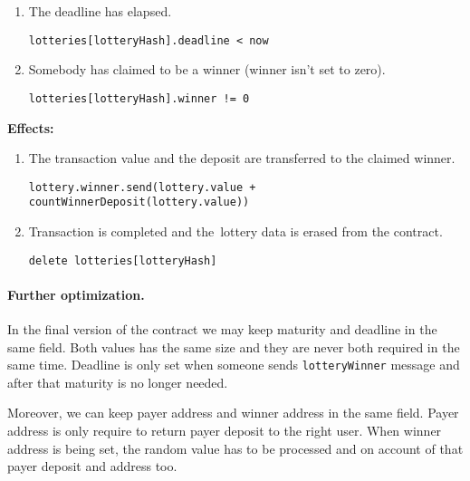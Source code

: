 \documentclass[a4paper]{article}
\begin{document}
\begin{enumerate}
            \begin{enumerate}
                \item The deadline has elapsed.
                    \begin{center}
		                \texttt{lotteries[lotteryHash].deadline < now}
		            \end{center}
                \item Somebody has claimed to be a winner (winner isn't set to zero).
                    \begin{center}
                        \texttt{lotteries[lotteryHash].winner != 0}
                    \end{center}
            \end{enumerate}
            \textbf{Effects:}
            \begin{enumerate}
                \item The transaction value and the deposit are transferred to the claimed winner.
                    \begin{center}
			            \texttt{lottery.winner.send(lottery.value + countWinnerDeposit(lottery.value))}
			        \end{center}
                \item Transaction is completed and the~lottery data is erased from the contract.
                    \begin{center}
                        \texttt{delete lotteries[lotteryHash]}
                    \end{center}
           \end{enumerate}
    \end{enumerate}

    \paragraph{Further optimization.} In the final version of the contract we may keep maturity and deadline in
        the same field. Both values has the same size and they are never both required in the same time. Deadline is
        only set when someone sends \texttt{lotteryWinner} message and after that maturity is no longer needed.

        Moreover, we can keep payer address and winner address in the same field. Payer address is only require to
        return payer deposit to the right user. When winner address is being set, the random value has to be
        processed and on account of that payer deposit and address too.
\end{document}
